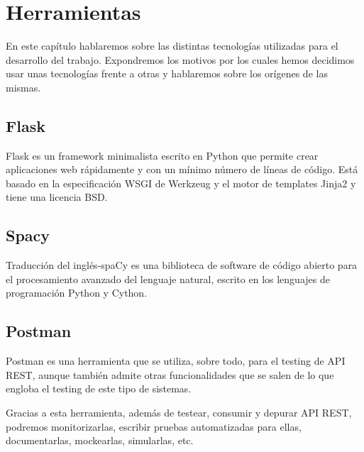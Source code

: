 \chapter{Herramientas}
\label{cap:herramientas}


En este capítulo hablaremos sobre las distintas tecnologías utilizadas para el desarrollo del trabajo. Expondremos los motivos por los cuales hemos decidimos usar unas tecnologías frente a otras y hablaremos sobre los
orígenes de las mismas.


\section{Flask}
Flask es un framework minimalista escrito en Python que permite crear aplicaciones web rápidamente y con un mínimo número de líneas de código. Está basado en la especificación WSGI de Werkzeug y el motor de templates Jinja2 y tiene una licencia BSD.
\section{Spacy}
Traducción del inglés-spaCy es una biblioteca de software de código abierto para el procesamiento avanzado del lenguaje natural, escrito en los lenguajes de programación Python y Cython.
\section{Postman}
Postman es una herramienta que se utiliza, sobre todo, para el testing de API REST, aunque también admite otras funcionalidades que se salen de lo que engloba el testing de este tipo de sistemas.

Gracias a esta herramienta, además de testear, consumir y depurar API REST, podremos monitorizarlas, escribir pruebas automatizadas para ellas, documentarlas, mockearlas, simularlas, etc.